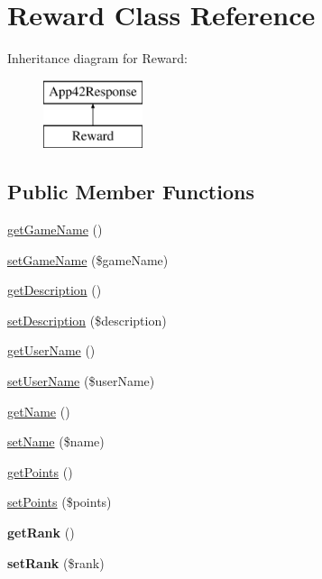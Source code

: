 \hypertarget{class_reward}{\section{Reward Class Reference}
\label{class_reward}
}
Inheritance diagram for Reward\+:\begin{figure}[H]
\begin{center}
\leavevmode
\includegraphics[height=2.000000cm]{class_reward}
\end{center}
\end{figure}
\subsection*{Public Member Functions}
\begin{DoxyCompactItemize}
\item 
\hyperlink{class_reward_aa001e9c5900be370cd4990e5d8abc6c1}{get\+Game\+Name} ()
\item 
\hyperlink{class_reward_a159ff188f56ba9f18b3eaa41018f4cc1}{set\+Game\+Name} (\$game\+Name)
\item 
\hyperlink{class_reward_a2e7bb35c71bf1824456ceb944cb7a845}{get\+Description} ()
\item 
\hyperlink{class_reward_a31fad3e39336ea079ea758e051866627}{set\+Description} (\$description)
\item 
\hyperlink{class_reward_aafd6d1ef27e6acc5833aba4012e5ee77}{get\+User\+Name} ()
\item 
\hyperlink{class_reward_a20f0087f72763b84d2992ba6ffee2fb2}{set\+User\+Name} (\$user\+Name)
\item 
\hyperlink{class_reward_a3d0963e68bb313b163a73f2803c64600}{get\+Name} ()
\item 
\hyperlink{class_reward_a2fe666694997d047711d7653eca2f132}{set\+Name} (\$name)
\item 
\hyperlink{class_reward_ae44144f741a78aeb3528a8443a9ac4f2}{get\+Points} ()
\item 
\hyperlink{class_reward_a46ef5896a018dec1f0a3c9ef43f7d050}{set\+Points} (\$points)
\item 
\hypertarget{class_reward_ad9b18cc3c110ea0dc7bd67a701d12a92}{{\bfseries get\+Rank} ()}\label{class_reward_ad9b18cc3c110ea0dc7bd67a701d12a92}

\item 
\hypertarget{class_reward_aa3513fc15cfb4ce47e47f9b47eda195b}{{\bfseries set\+Rank} (\$rank)}\label{class_reward_aa3513fc15cfb4ce47e47f9b47eda195b}

\end{DoxyCompactItemize}
